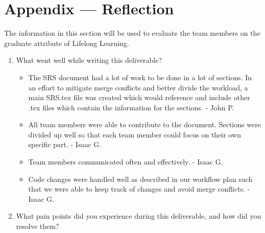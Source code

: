 \section*{Appendix --- Reflection}


The information in this section will be used to evaluate the team members on the
graduate attribute of Lifelong Learning.  

%

\begin{enumerate}
  \item What went well while writing this deliverable?
  
	\begin{itemize}
		\item The SRS document had a lot of work to be done in a lot of sections. In an effort to mitigate merge conflicts and better divide the workload, a main SRS.tex file was created which would reference and include other .tex files which contain the information for the sections. - John P.
		\item All team members were able to contribute to the document. Sections were divided up well so that each team member could focus on their own specific part. - Isaac G.
    \item Team members communicated often and effectively. - Isaac G.
    \item Code changes were handled well as described in our workflow plan such that we were able to keep track of changes and avoid merge conflicts. - Isaac G.
	\end{itemize}  
  
  \item What pain points did you experience during this deliverable, and how did
  you resolve them?
  

\end{enumerate}
